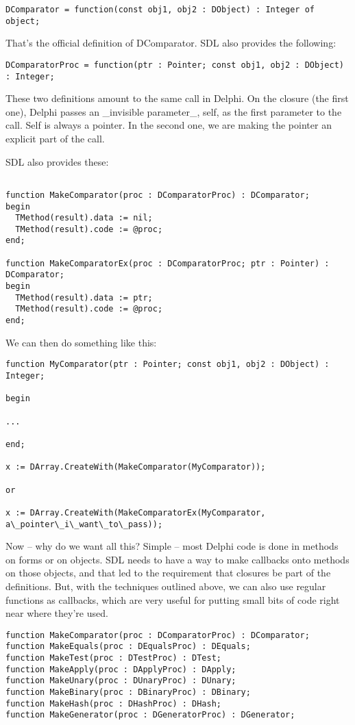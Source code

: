 \documentclass{report}
\begin{document}
\lstinline|DComparator = function(const obj1, obj2 : DObject) : Integer of object;|

That's the official definition of DComparator. SDL also 
provides the following:

\lstinline|DComparatorProc = function(ptr : Pointer; const obj1, obj2 : DObject) : Integer;|

These two definitions amount to the same call in Delphi.  On the closure
(the first one), Delphi passes an \_invisible parameter\_, self, as the
first parameter to the call. Self is always a pointer. In the second one, we
are making the pointer an explicit part of the call.

SDL also provides these:

\begin{lstlisting}

function MakeComparator(proc : DComparatorProc) : DComparator;
begin
  TMethod(result).data := nil;
  TMethod(result).code := @proc;
end;

function MakeComparatorEx(proc : DComparatorProc; ptr : Pointer) : DComparator;
begin
  TMethod(result).data := ptr;
  TMethod(result).code := @proc;
end;
\end{lstlisting}

We can then do something like this:

\begin{lstlisting}
function MyComparator(ptr : Pointer; const obj1, obj2 : DObject) : Integer;

begin

...

end;

x := DArray.CreateWith(MakeComparator(MyComparator));

or

x := DArray.CreateWith(MakeComparatorEx(MyComparator, 
a\_pointer\_i\_want\_to\_pass));

\end{lstlisting}

Now -- why do we want all this? Simple -- most Delphi code is done in
methods on forms or on objects. SDL needs to have a way to make callbacks
onto methods on those objects, and that led to the requirement that closures
be part of the definitions.  But, with the techniques outlined above, we can
also use regular functions as callbacks, which are very useful for putting
small bits of code right near where they're used.

\begin{lstlisting}
function MakeComparator(proc : DComparatorProc) : DComparator;
function MakeEquals(proc : DEqualsProc) : DEquals;
function MakeTest(proc : DTestProc) : DTest;
function MakeApply(proc : DApplyProc) : DApply;
function MakeUnary(proc : DUnaryProc) : DUnary;
function MakeBinary(proc : DBinaryProc) : DBinary;
function MakeHash(proc : DHashProc) : DHash;
function MakeGenerator(proc : DGeneratorProc) : DGenerator;
\end{lstlisting}
\end{document}
